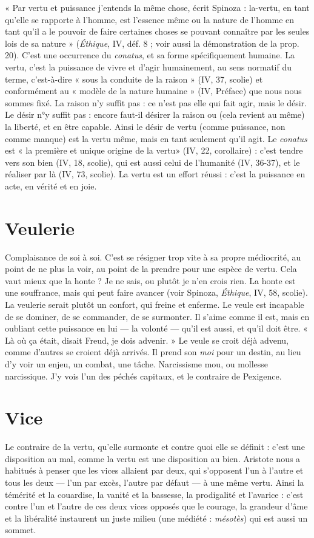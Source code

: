« Par vertu et puissance j'entends la même chose, écrit Spinoza : la-vertu, en
tant qu’elle se rapporte à l’homme, est l’essence même ou la nature de l’homme
en tant qu’il a le pouvoir de faire certaines choses se pouvant connaître par les
seules lois de sa nature » ({\it Éthique}, IV, déf. 8 ; voir aussi la démonstration de la
prop. 20). C’est une occurrence du {\it conatus}, et sa forme spécifiquement
humaine. La vertu, c’est la puissance de vivre et d’agir humainement, au sens
normatif du terme, c’est-à-dire « sous la conduite de la raison » (IV, 37, scolie)
et conformément au « modèle de la nature humaine » (IV, Préface) que nous
nous sommes fixé. La raison n’y suffit pas : ce n’est pas elle qui fait agir, mais
le désir. Le désir n°y suffit pas : encore faut-il désirer la raison ou (cela revient
au même) la liberté, et en être capable. Ainsi le désir de vertu (comme puissance,
non comme manque) est la vertu même, mais en tant seulement qu’il
agit. Le {\it conatus} est « la première et unique origine de la vertu» (IV, 22,
corollaire) : c’est tendre vers son bien (IV, 18, scolie), qui est aussi celui de
l'humanité (IV, 36-37), et le réaliser par là (IV, 73, scolie). La vertu est un
effort réussi : c’est la puissance en acte, en vérité et en joie.

\section{Veulerie}
Complaisance de soi à soi. C’est se résigner trop vite à sa propre
médiocrité, au point de ne plus la voir, au point de la prendre
pour une espèce de vertu. Cela vaut mieux que la honte ? Je ne sais, ou plutôt
je n’en crois rien. La honte est une souffrance, mais qui peut faire avancer (voir
Spinoza, {\it Éthique}, IV, 58, scolie). La veulerie serait plutôt un confort, qui freine
et enferme. Le veule est incapable de se dominer, de se commander, de se surmonter.
Il s'aime comme il est, mais en oubliant cette puissance en lui — la
volonté — qu’il est aussi, et qu’il doit être. « Là où ça était, disait Freud, je dois
advenir. » Le veule se croit déjà advenu, comme d’autres se croient déjà arrivés.
Il prend son {\it moi} pour un destin, au lieu d’y voir un enjeu, un combat, une
tâche. Narcissisme mou, ou mollesse narcissique. J’y vois l’un des péchés capitaux,
et le contraire de Pexigence.

\section{Vice}
Le contraire de la vertu, qu’elle surmonte et contre quoi elle se définit :
c’est une disposition au mal, comme la vertu est une disposition
au bien.
Aristote nous a habitués à penser que les vices allaient par deux, qui s’opposent
l'un à l’autre et tous les deux — l’un par excès, l’autre par défaut — à une
même vertu. Ainsi la témérité et la couardise, la vanité et la bassesse, la prodigalité
et l’avarice : c’est contre l’un et l’autre de ces deux vices opposés que le
courage, la grandeur d’âme et la libéralité instaurent un juste milieu (une
médiété : {\it mésotès}) qui est aussi un sommet.

